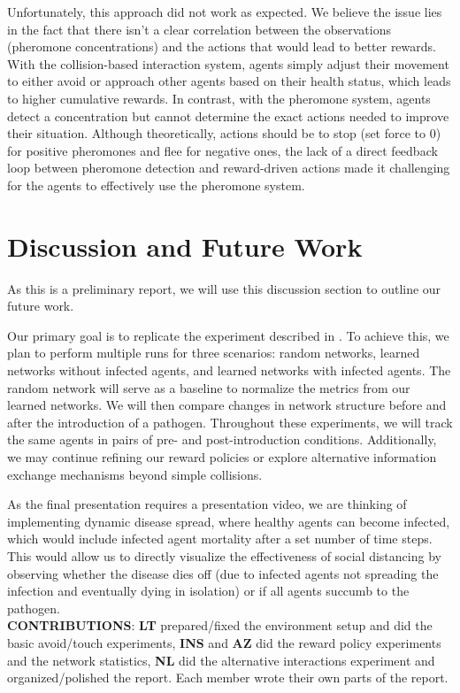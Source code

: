 \documentclass[9pt]{IEEEtran}
\begin{document}
Unfortunately, this approach did not work as expected. We believe the issue lies in the fact that there isn't a clear correlation between the observations (pheromone concentrations) and the actions that would lead to better rewards. With the collision-based interaction system, agents simply adjust their movement to either avoid or approach other agents based on their health status, which leads to higher cumulative rewards. In contrast, with the pheromone system, agents detect a concentration but cannot determine the exact actions needed to improve their situation. Although theoretically, actions should be to stop (set force to 0) for positive pheromones and flee for negative ones, the lack of a direct feedback loop between pheromone detection and reward-driven actions made it challenging for the agents to effectively use the pheromone system.

\section{Discussion and Future Work}

As this is a preliminary report, we will use this discussion section to outline our future work.

Our primary goal is to replicate the experiment described in \cite{Stroeymeyt2018}. To achieve this, we plan to perform multiple runs for three scenarios: random networks, learned networks without infected agents, and learned networks with infected agents. The random network will serve as a baseline to normalize the metrics from our learned networks. We will then compare changes in network structure before and after the introduction of a pathogen. Throughout these experiments, we will track the same agents in pairs of pre- and post-introduction conditions. Additionally, we may continue refining our reward policies or explore alternative information exchange mechanisms beyond simple collisions.

As the final presentation requires a presentation video, we are thinking of implementing dynamic disease spread, where healthy agents can become infected, which would include infected agent mortality after a set number of time steps. This would allow us to directly visualize the effectiveness of social distancing by observing whether the disease dies off (due to infected agents not spreading the infection and eventually dying in isolation) or if all agents succumb to the pathogen.\\

\noindent\textbf{CONTRIBUTIONS}: \textbf{LT} prepared/fixed the environment setup and did the basic avoid/touch experiments, \textbf{INS} and \textbf{AZ} did the reward policy experiments and the network statistics, \textbf{NL} did the alternative interactions experiment and organized/polished the report. Each member wrote their own parts of the report.

\printbibliography
\end{document}
